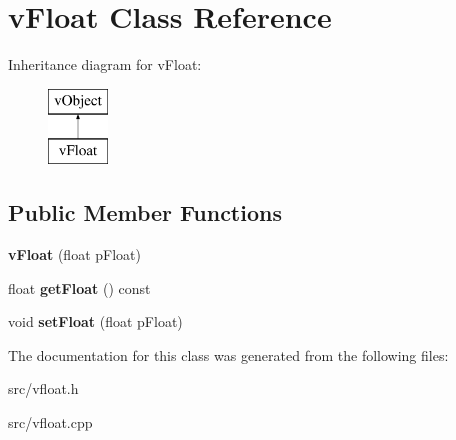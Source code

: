 \hypertarget{classv_float}{\section{v\-Float Class Reference}
\label{classv_float}
}
Inheritance diagram for v\-Float\-:\begin{figure}[H]
\begin{center}
\leavevmode
\includegraphics[height=2.000000cm]{classv_float}
\end{center}
\end{figure}
\subsection*{Public Member Functions}
\begin{DoxyCompactItemize}
\item 
\hypertarget{classv_float_af70116bbae127513b0468435ec7daa2b}{{\bfseries v\-Float} (float p\-Float)}\label{classv_float_af70116bbae127513b0468435ec7daa2b}

\item 
\hypertarget{classv_float_a602cebb2b5ecfe2a439cd1b4a7cad141}{float {\bfseries get\-Float} () const }\label{classv_float_a602cebb2b5ecfe2a439cd1b4a7cad141}

\item 
\hypertarget{classv_float_aa66395cb5f0b650f4c46e7889cbd9ac5}{void {\bfseries set\-Float} (float p\-Float)}\label{classv_float_aa66395cb5f0b650f4c46e7889cbd9ac5}

\end{DoxyCompactItemize}


The documentation for this class was generated from the following files\-:\begin{DoxyCompactItemize}
\item 
src/vfloat.\-h\item 
src/vfloat.\-cpp\end{DoxyCompactItemize}
